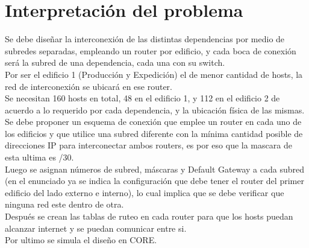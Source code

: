 \section{Interpretación del problema}
Se debe diseñar la interconexión de las distintas dependencias por medio de subredes separadas, empleando un router por edificio, y cada boca de conexión será la subred de una dependencia, cada una con su switch.\\

Por ser el edificio 1 (Producción y Expedición) el de menor cantidad de hosts, la red de interconexión se ubicará en ese router.\\

Se necesitan 160 hosts en total, 48 en el edificio 1, y 112 en el edificio 2 de acuerdo a lo requerido por cada dependencia, y la ubicación física de las mismas.\\

Se debe proponer un esquema de conexión que emplee un router en cada uno de los edificios y que utilice una subred diferente con la mínima cantidad posible de direcciones IP para interconectar ambos routers, es por eso que la mascara de esta ultima es /30.\\

Luego se asignan números de subred, máscaras y Default Gateway a cada subred (en el enunciado ya se indica la configuración que debe tener el router del primer edificio del lado externo e interno), lo cual implica que se debe verificar que ninguna red este dentro de otra.\\

Después se crean las tablas de ruteo en cada router para que los hosts puedan alcanzar internet y se puedan comunicar entre si.\\

Por ultimo se simula el diseño en CORE.\\
